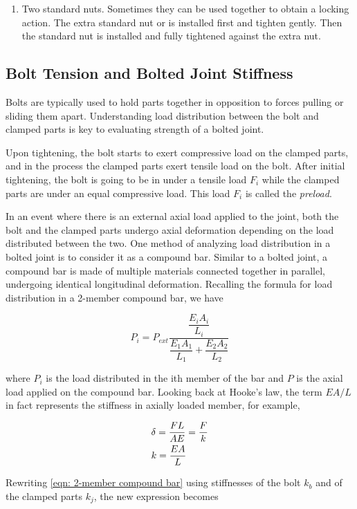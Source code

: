 \documentclass[a4paper,openany,nobib]{tufte-book}
\begin{document}
{{\begin{enumerate}
\item Two standard nuts. Sometimes they can be used together to obtain a
locking action. The extra standard nut or is installed first and
tighten gently. Then the standard nut is installed and fully
tightened against the extra nut.
\end{enumerate}

\subsection{Bolt Tension and Bolted Joint Stiffness}
\label{bolt-tension-and-bolted-joint-stiffness}
Bolts are typically used to hold parts together in opposition to forces
pulling or sliding them apart. Understanding load distribution between
the bolt and clamped parts is key to evaluating strength of a bolted
joint.

Upon tightening, the bolt starts to exert compressive load on the
clamped parts, and in the process the clamped parts exert tensile load
on the bolt. After initial tightening, the bolt is going to be in under
a tensile load \(F_i\) while the clamped parts are under an equal
compressive load. This load \(F_i\) is called the \emph{preload}.

In an event where there is an external axial load applied to the joint,
both the bolt and the clamped parts undergo axial deformation depending
on the load distributed between the two. One method of analyzing load
distribution in a bolted joint is to consider it as a compound bar.
Similar to a bolted joint, a compound bar is made of multiple materials
connected together in parallel, undergoing identical longitudinal
deformation. Recalling the formula for load distribution in a 2-member
compound bar, we have

$$ P_i = P_{ext}\frac{\dfrac{E_iA_i}{L_i}}{\dfrac{E_1A_1}{L_1} + \dfrac{E_2A_2}{L_2}}$$

where \(P_i\) is the load distributed in the ith member of the bar and \(P\)
is the axial load applied on the compound bar. Looking back at Hooke's
law, the term \(EA/L\) in fact represents the stiffness in axially loaded
member, for example,

$$\begin{gathered}
  \delta  = \frac{FL}{AE} = \frac{F}{k} \hfill \\
  k = \frac{EA}{L} \hfill \\ 
\end{gathered}$$

Rewriting \ref{eqn: 2-member compound bar}
using stiffnesses of the bolt \(k_b\) and of the clamped parts \(k_j\), the
new expression becomes


}}
\end{document}
